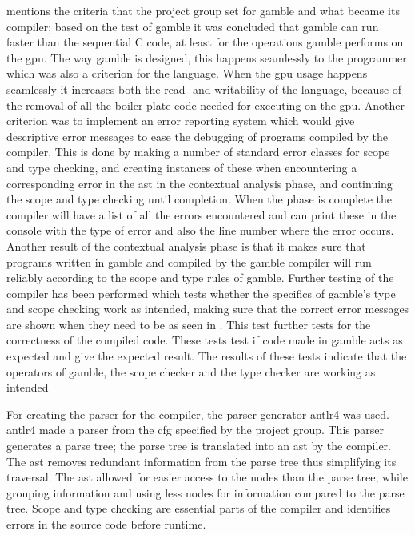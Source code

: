  mentions the criteria that the project group set for \gls{gamble} and what became its compiler; based on the test of \gls{gamble} it was concluded that \gls{gamble} can run faster than the sequential C code, at least for the operations \gls{gamble} performs on the \acrshort{gpu}.
The way \gls{gamble} is designed, this happens seamlessly to the programmer which was also a criterion for the language.
When the \acrshort{gpu} usage happens seamlessly it increases both the read- and writability of the language, because of the removal of all the boiler-plate code needed for executing on the \acrshort{gpu}.
Another criterion was to implement an error reporting system which would give descriptive error messages to ease the debugging of programs compiled by the compiler.
This is done by making a number of standard error classes for scope and type checking, and creating instances of these when encountering a corresponding error in the \acrshort{ast} in the contextual analysis phase, and continuing the scope and type checking until completion.
When the phase is complete the compiler will have a list of all the errors encountered and can print these in the console with the type of error and also the line number where the error occurs.
Another result of the contextual analysis phase is that it makes sure that programs written in \gls{gamble} and compiled by the \gls{gamble} compiler will run reliably according to the scope and type rules of \gls{gamble}.
Further testing of the compiler has been performed which tests whether the specifics of \gls{gamble}'s type and scope checking work as intended, making sure that the correct error messages are shown when they need to be as seen in .
This test further tests for the correctness of the compiled code.
These tests test if code made in \gls{gamble} acts as expected and give the expected result.
The results of these tests indicate that the operators of \gls{gamble}, the scope checker and the type checker are working as intended 

For creating the parser for the compiler, the parser generator \acrshort{antlr}4 was used.
\acrshort{antlr}4 made a parser from the \acrshort{cfg} specified by the project group.
This parser generates a parse tree; the parse tree is translated into an \acrshort{ast} by the compiler.
The \acrshort{ast} removes redundant information from the parse tree thus simplifying its traversal.
The \acrshort{ast} allowed for easier access to the nodes than the parse tree, while grouping information and using less nodes for information compared to the parse tree.
Scope and type checking are essential parts of the compiler and identifies errors in the source code before runtime.

